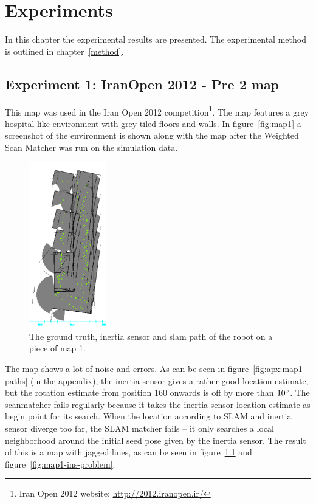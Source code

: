 \chapter{Experiments}
\label{experiments}
In this chapter the experimental results are presented. The experimental method is outlined in chapter~\ref{method}. 

\section{Experiment 1: IranOpen 2012 - Pre 2 map}
This map was used in the Iran Open 2012 competition\footnote{Iran Open 2012 website: \url{http://2012.iranopen.ir/}}. The map features a grey hospital-like environment with grey tiled floors and walls. In figure~\ref{fig:map1} a screenshot of the environment is shown along with the map after the Weighted Scan Matcher was run on the simulation data. 

\begin{figure}[ht]
\centering
	\includegraphics[width=0.3\textwidth]{images/experiment/map1/slam.png}
  \caption{The ground truth, inertia sensor and slam path of the robot on a piece of map 1.}
  \label{fig:map1-map}
\end{figure}

The map shows a lot of noise and errors. As can be seen in figure~\ref{fig:apx:map1-paths} (in the appendix), the inertia sensor gives a rather good location-estimate, but the rotation estimate from position 160 onwards is off by more than $10\degree$. The scanmatcher fails regularly because it takes the inertia sensor location estimate as begin point for its search. When the location according to SLAM and inertia sensor diverge too far, the SLAM matcher fails -- it only searches a local neighborhood around the initial seed pose given by the inertia sensor. The result of this is a map with jagged lines, as can be seen in figure~\ref{fig:map1-map} and figure~\ref{fig:map1-ins-problem}.

